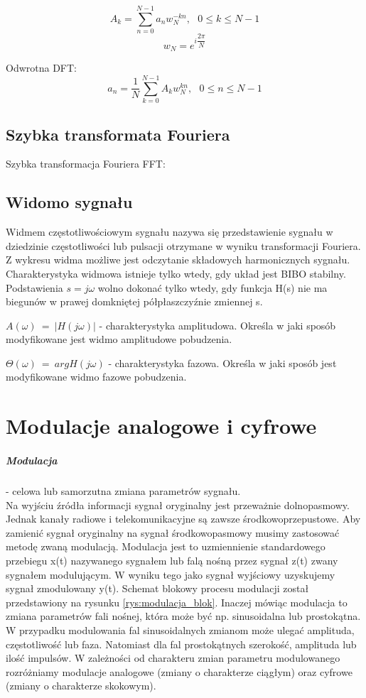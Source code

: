 \documentclass[a4paper,twoside]{report}
\begin{document}
\begin{equation}
A_{k}=\sum_{n=0}^{N-1}a_{n}w_{N}^{-kn}, ~~~0\le k \le N-1
\end{equation}
\begin{equation}
w_{N}=e^{i\dfrac{2\pi}{N}}
\end{equation}

Odwrotna DFT:
\begin{equation}
a_{n}=\dfrac{1}{N}\sum_{k=0}^{N-1}A_{k}w_{N}^{kn}, ~~~0\le n \le N-1
\end{equation}

\subsection{Szybka transformata Fouriera}
Szybka transformacja Fouriera FFT:

\subsection{Widomo sygnału}
Widmem częstotliwościowym sygnału nazywa się przedstawienie sygnału w dziedzinie częstotliwości lub pulsacji otrzymane w wyniku transformacji Fouriera. Z wykresu widma możliwe jest odczytanie składowych harmonicznych sygnału. Charakterystyka widmowa istnieje tylko wtedy, gdy układ jest BIBO stabilny. Podstawienia  $s = j\omega$ wolno dokonać tylko wtedy, gdy funkcja H(s) nie ma biegunów w prawej domkniętej półpłaszczyźnie zmiennej s.
\medskip 

$A(\omega)~=~|H(j\omega)|$ - charakterystyka amplitudowa. Określa w jaki sposób modyfikowane jest widmo amplitudowe pobudzenia.
\medskip 

$\Theta(\omega)~=~argH(j\omega)$ - charakterystyka fazowa. Określa w jaki sposób jest modyfikowane widmo fazowe pobudzenia.
\section{Modulacje analogowe i cyfrowe}
\subparagraph{Modulacja} - celowa lub samorzutna zmiana parametrów sygnału. \\

Na wyjściu źródła informacji sygnał oryginalny jest przeważnie dolnopasmowy. Jednak kanały radiowe i telekomunikacyjne są zawsze środkowoprzepustowe. Aby zamienić sygnał oryginalny na sygnał środkowopasmowy musimy zastosować metodę zwaną modulacją. Modulacja jest to uzmiennienie standardowego przebiegu x(t) nazywanego sygnałem lub falą nośną przez sygnał z(t) zwany sygnałem modulującym. W wyniku tego jako sygnał wyjściowy uzyskujemy sygnał zmodulowany y(t). Schemat blokowy procesu modulacji został przedstawiony na rysunku \ref{rys:modulacja_blok}. Inaczej mówiąc modulacja to zmiana parametrów fali nośnej, która może być np. sinusoidalna lub prostokątna. W przypadku modulowania fal sinusoidalnych zmianom może ulegać amplituda, częstotliwość lub faza. Natomiast dla fal prostokątnych szerokość, amplituda lub ilość impulsów. W zależności od charakteru zmian parametru modulowanego rozróżniamy modulacje analogowe (zmiany o charakterze ciągłym) oraz cyfrowe (zmiany o charakterze skokowym).
\end{document}
